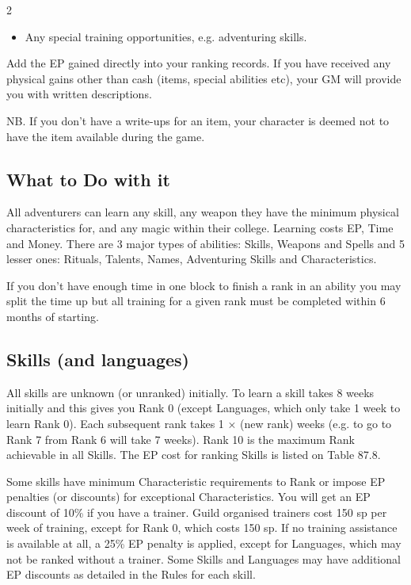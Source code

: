 \begin{multicols}{2}
\begin{itemize}
\item Any special training opportunities, e.g.  adventuring skills.
\end{itemize}

Add the EP gained directly into your ranking records. If you have
received any physical gains other than cash (items, special abilities
etc), your GM will provide you with written descriptions.

NB. If you don’t have a write-ups for an item, your character is
deemed not to have the item available during the game.

\subsection{What to Do with it}

All adventurers can learn any skill, any weapon they have the minimum
physical characteristics for, and any magic within their college.
Learning costs EP, Time and Money.  There are 3 major types of
abilities: Skills, Weapons and Spells and 5 lesser ones: Rituals,
Talents, Names, Adventuring Skills and Characteristics.

If you don’t have enough time in one block to finish a rank in an
ability you may split the time up but all training for a given rank
must be completed within 6 months of starting.

\subsection{Skills (and languages)}

All skills are unknown (or unranked) initially.  To learn a skill
takes 8 weeks initially and this gives you Rank 0 (except Languages,
which only take 1 week to learn Rank 0). Each subsequent rank takes 1
× (new rank) weeks (e.g. to go to Rank 7 from Rank 6 will take 7
weeks). Rank 10 is the maximum Rank achievable in all Skills. The EP
cost for ranking Skills is listed on Table 87.8.

Some skills have minimum Characteristic requirements to Rank or impose
EP penalties (or discounts) for exceptional Characteristics.  You will
get an EP discount of 10\% if you have a trainer. Guild organised
trainers cost 150 sp per week of training, except for Rank 0, which
costs 150 sp. If no training assistance is available at all, a 25\% EP
penalty is applied, except for Languages, which may not be ranked
without a trainer.  Some Skills and Languages may have additional EP
discounts as detailed in the Rules for each skill.


\end{multicols}
